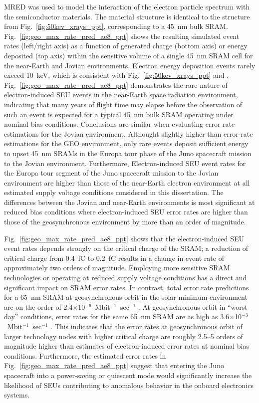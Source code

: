 MRED was used to model the interaction of the electron particle spectrum with the semiconductor materials. 
The material structure is identical to the structure from Fig.~\ref{fig:50kev_xrays_ppt}, corresponding to a 45~nm bulk SRAM.
Fig.~\ref{fig:geo_max_rate_pred_ae8_ppt} shows the resulting simulated event rates (left/right axis) as a function of generated charge (bottom axis) or energy deposited (top axis) within the sensitive volume of a single 45~nm SRAM cell for the near-Earth and Jovian environments. 
Electron energy deposition events rarely exceed 10~keV, which is consistent with Fig.~\ref{fig:50kev_xrays_ppt} and \cite{King:2010cu, King:2012cb}. 
Fig.~\ref{fig:geo_max_rate_pred_ae8_ppt} demonstrates the rare nature of electron-induced SEU events in the near-Earth space radiation environment, indicating that many years of flight time may elapse before the observation of such an event is expected for a typical 45~nm bulk SRAM operating under nominal bias conditions.  
Conclusions are similar when evaluating error rate estimations for the Jovian environment.
Althought slightly higher than error-rate estimations for the GEO environment, only rare events deposit sufficient energy to upset 45~nm SRAMs in the Europa tour phase of the Juno spacecraft mission to the Jovian environment.
Furthermore, Electron-induced SEU event rates for the Europa tour segment of the Juno spacecraft mission to the Jovian environment are higher than those of the near-Earth electron environment at all estimated supply voltage conditions considered in this dissertation.
The differences between the Jovian and near-Earth environments is most significant at reduced bias conditions where electron-induced SEU error rates are higher than those of the geosynchronous environment by more than an order of magnitude.

Fig.~\ref{fig:geo_max_rate_pred_ae8_ppt} shows that the electron-induced SEU event rates depends strongly on the critical charge of the SRAM; a reduction of critical charge from 0.4~fC to 0.2~fC results in a change in event rate of approximately two orders of magnitude. 
Employing more sensitive SRAM technologies or operating at reduced supply voltage conditions has a direct and significant impact on SRAM error rates. 
In contrast, total error rate predictions for a 65~nm SRAM at geosynchronous orbit in the solar minimum environment are on the order of 2.4$\times$10$^{-6}$~Mbit$^{-1}$~sec$^{-1}$ \cite{Sierawski:2009ka}.
At geosynchronous orbit in ``worst-day'' conditions, error rates for the same 65~nm SRAM are as high as 3.6$\times$10$^{-3}$~Mbit$^{-1}$~sec$^{-1}$ \cite{Sierawski:2009ka}.
This indicates that the error rates at geosynchronous orbit of larger technology nodes with higher critical charge are roughly 2.5--5 orders of magnitude higher than estimates of electron-induced error rates at nominal bias conditions.
Furthermore, the estimated error rates in Fig.~\ref{fig:geo_max_rate_pred_ae8_ppt} suggest that entering the Juno spacecraft into a power-saving or quiescent mode would significantly increase the likelihood of SEUs contributing to anomalous behavior in the onboard electronics systems.

